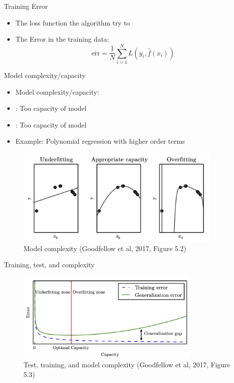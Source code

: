 \documentclass[10pt]{beamer}
\begin{document}
\begin{frame}{Training Error}

\begin{itemize}
\item The loss function the algorithm try to 
\item The Error in the training data:
\[
\overline{\text{err}} = \frac{1}{N} \sum_{i=1}^N L(y_i,\hat{f}(x_i))
\]

\end{itemize}

\end{frame}


\begin{frame}{Model complexity/capacity}

\begin{itemize}
\item Model complexity/capacity: 
\item {}: Too  capacity of model
\item {}: Too  capacity of model
\item Example: Polynomial regression with higher order terms
\end{itemize}

\begin{figure}[h]
\caption{Model complexity (Goodfellow et al, 2017, Figure 5.2)}
\centering
\includegraphics[width=0.9\textwidth]{figs/Dl_5_2}
\end{figure}

\end{frame}


\begin{frame}{Training, test, and complexity}


\begin{figure}[h]
\caption{Test, training, and model complexity (Goodfellow et al, 2017, Figure 5.3)}
\centering
\includegraphics[width=0.8\textwidth]{figs/Dl_5_3.png}
\end{figure}

\end{frame}
\end{document}
